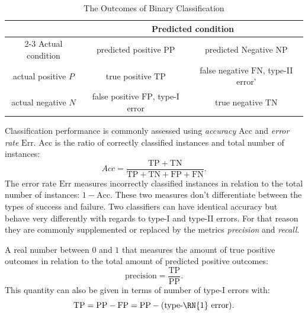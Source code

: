     \begin{table}
        \centering
        \begin{tabular}{ccc}
            \toprule
            & \multicolumn{2}{c}{Predicted condition}\\ 
            \cmidrule{2-3}
            Actual condition & predicted positive $\mathrm{PP}$ & predicted Negative $\mathrm{NP}$\\
            \midrule
            actual positive $P$ & true positive $\mathrm{TP}$ & false negative $\mathrm{FN}$, type-\RN{2} error'\\
            actual negative $N$ & false positive $\mathrm{FP}$, type-\RN{1} error & true negative $\mathrm{TN}$\\
            \bottomrule
        \end{tabular}
        \caption{The Outcomes of  Binary Classification}
        \label{tab:classificationOutcome} 
    \end{table}

    Classification performance is commonly assessed using \emph{accuracy} $\mathrm{Acc}$ and \emph{error rate} $\mathrm{Err}$.
    $\mathrm{Acc}$ is the ratio of correctly classified instances and total number of instances:
    \begin{equation}
        Acc = \frac{\mathrm{TP} + \mathrm{TN}}{\mathrm{TP} + \mathrm{TN} + \mathrm{FP} + \mathrm{FN}}\text{.}
    \end{equation}
    The error rate $\mathrm{Err}$ measures incorrectly classified instances in relation to the total number of instances: $1-\mathrm{Acc}$.
    These two measures don't differentiate between the types of success and failure.
    Two classifiers can have identical accuracy but behave very differently with regards to type-\RN{1} and type-\RN{2} errors.
    For that reason they are commonly supplemented or replaced by the metrics \emph{precision} and \emph{recall}. 
    
    \begin{definition}[precision]
        A real number between $0$ and $1$ that measures the amount of true positive outcomes in relation to the total amount of predicted positive outcomes:
        \begin{equation}
            \mathrm{precision} = \frac{\mathrm{TP}}{\mathrm{PP}}\text{.}
        \end{equation}
        This quantity can also be given in terms of number of type-\RN{1} errors with:
        \begin{equation}
            \mathrm{TP} = \mathrm{PP} - \mathrm{FP} = \mathrm{PP} - (\text{type-\RN{1} error})\text{.}
        \end{equation}
    \end{definition}

